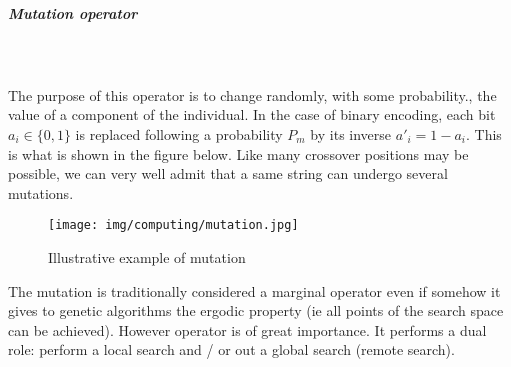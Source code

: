 	\subparagraph{Mutation operator}\mbox{}\\\\
	The purpose of this operator is to change randomly, with some probability., the value of a component of the individual. In the case of binary encoding, each bit $a_i\in\{0,1\}$ is replaced following a probability $P_m$ by its inverse ${a'}_i=1-a_i$. This is what is shown in the figure below. Like many crossover positions may be possible, we can very well admit that a same string can undergo several mutations.
	\begin{figure}[H]
		\centering
		\texttt{[image: img/computing/mutation.jpg]}
		\caption{Illustrative example of mutation}
	\end{figure}
	The mutation is traditionally considered a marginal operator even if somehow it gives to genetic algorithms the ergodic property (ie all points of the search space can be achieved). However operator is of great importance. It performs a dual role: perform a local search and / or out a global search (remote search).
	
